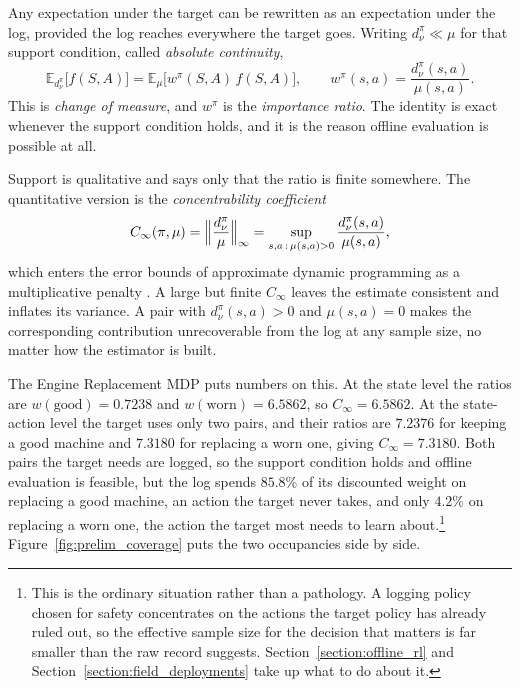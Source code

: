 Any expectation under the target can be rewritten as an expectation under the log, provided the log reaches everywhere the target goes. Writing $d^\pi_\nu \ll \mu$ for that support condition, called \emph{absolute continuity},
\begin{equation}
\mathbb{E}_{d^\pi_\nu}\bigl[ f(S,A) \bigr]
= \mathbb{E}_{\mu}\bigl[ w^\pi(S,A)\, f(S,A) \bigr],
\qquad
w^\pi(s,a) = \frac{d^\pi_\nu(s,a)}{\mu(s,a)} .
\label{eq:prelim_change_of_measure}
\end{equation}
This is \emph{change of measure}, and $w^\pi$ is the \emph{importance ratio}. The identity is exact whenever the support condition holds, and it is the reason offline evaluation is possible at all.

Support is qualitative and says only that the ratio is finite somewhere. The quantitative version is the \emph{concentrability coefficient}
\begin{equation}
C_\infty(\pi, \mu) = \Bigl\| \frac{d^\pi_\nu}{\mu} \Bigr\|_\infty
= \sup_{s,a\, :\, \mu(s,a) > 0} \frac{d^\pi_\nu(s,a)}{\mu(s,a)},
\label{eq:prelim_concentrability}
\end{equation}
which enters the error bounds of approximate dynamic programming as a multiplicative penalty \citep{MunosSzepesvari2008}. A large but finite $C_\infty$ leaves the estimate consistent and inflates its variance. A pair with $d^\pi_\nu(s,a) > 0$ and $\mu(s,a) = 0$ makes the corresponding contribution unrecoverable from the log at any sample size, no matter how the estimator is built.

The Engine Replacement MDP puts numbers on this. At the state level the ratios are $w(\text{good}) = 0.7238$ and $w(\text{worn}) = 6.5862$, so $C_\infty = 6.5862$. At the state-action level the target uses only two pairs, and their ratios are $7.2376$ for keeping a good machine and $7.3180$ for replacing a worn one, giving $C_\infty = 7.3180$. Both pairs the target needs are logged, so the support condition holds and offline evaluation is feasible, but the log spends $85.8\%$ of its discounted weight on replacing a good machine, an action the target never takes, and only $4.2\%$ on replacing a worn one, the action the target most needs to learn about.\footnote{This is the ordinary situation rather than a pathology. A logging policy chosen for safety concentrates on the actions the target policy has already ruled out, so the effective sample size for the decision that matters is far smaller than the raw record suggests. Section~\ref{section:offline_rl} and Section~\ref{section:field_deployments} take up what to do about it.} Figure~\ref{fig:prelim_coverage} puts the two occupancies side by side.

